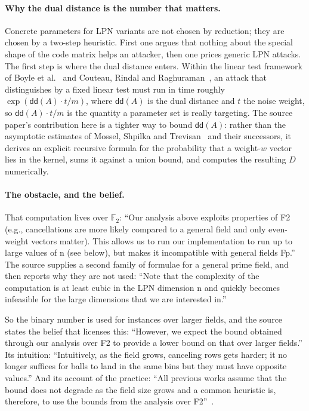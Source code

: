 \documentclass{aicr-conjecture}
\newcommand{\F}{\mathbb{F}}
\newcommand{\dd}{\mathsf{dd}}
\begin{document}
\paragraph{Why the dual distance is the number that matters.}
Concrete parameters for LPN variants are not chosen by reduction; they
are chosen by a two-step heuristic. First one argues that nothing about
the special shape of the code matrix helps an attacker, then one prices
generic LPN attacks. The first step is where the dual distance enters.
Within the linear test framework of Boyle et al.~\cite{BCGIKS20} and
Couteau, Rindal and Raghuraman~\cite{CRR21}, an attack that distinguishes
by a fixed linear test must run in time roughly
$\exp(\dd(A) \cdot t / m)$, where $\dd(A)$ is the dual distance and $t$
the noise weight, so $\dd(A) \cdot t / m$ is the quantity a parameter
set is really targeting. The source paper's contribution here is a
tighter way to bound $\dd(A)$: rather than the asymptotic estimates of
Mossel, Shpilka and Trevisan~\cite{MST03} and their successors, it
derives an explicit recursive formula for the probability that a
weight-$w$ vector lies in the kernel, sums it against a union bound, and
computes the resulting $D$ numerically.

\paragraph{The obstacle, and the belief.}
That computation lives over $\F_{2}$: ``Our analysis above exploits
properties of F2 (e.g., cancellations are more likely compared to a
general field and only even-weight vectors matter). This allows us to
run our implementation to run up to large values of n (see below), but
makes it incompatible with general fields Fp.'' The source supplies a
second family of formulae for a general prime field, and then reports
why they are not used: ``Note that the complexity of the computation is
at least cubic in the LPN dimension n and quickly becomes infeasible for
the large dimensions that we are interested in.''

So the binary number is used for instances over larger fields, and the
source states the belief that licenses this: ``However, we expect the
bound obtained through our analysis over F2 to provide a lower bound on
that over larger fields.'' Its intuition: ``Intuitively, as the field
grows, canceling rows gets harder; it no longer suffices for balls to
land in the same bins but they must have opposite values.'' And its
account of the practice: ``All previous works assume that the bound does
not degrade as the field size grows and a common heuristic is,
therefore, to use the bounds from the analysis over
F2''~\cite{ADINZ17,BCGI18}.
\end{document}
